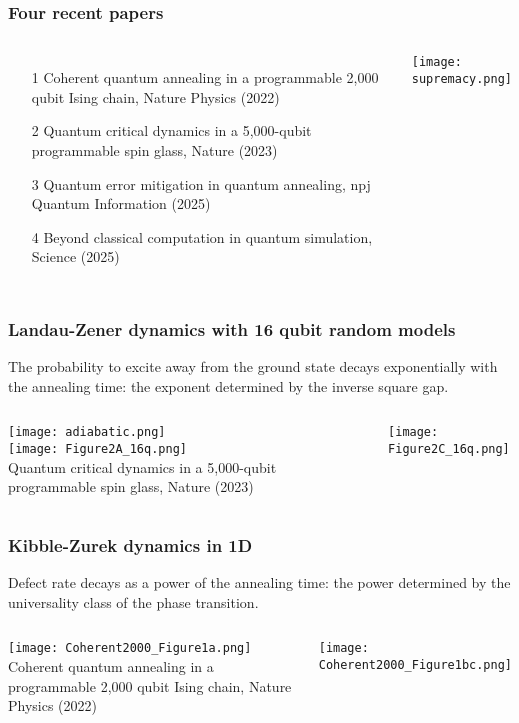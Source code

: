 \documentclass[aspectratio=169,final,11pt,forpublic]{beamer} %
\begin{document}
\begin{frame}\frametitle{\bf Four recent papers}
  \begin{columns}
    \vspace{-0.2cm}
  \begin{itemize}
    \item[1] Coherent quantum annealing in
      a programmable 2,000 qubit Ising chain, Nature
      Physics (2022)
    \item[2] Quantum critical dynamics in
      a 5,000-qubit programmable spin glass, Nature
      (2023)
    \item[3] Quantum error mitigation in quantum annealing, npj Quantum Information (2025)
    \item[4] Beyond classical computation in quantum simulation, Science (2025)
  \end{itemize}
  \texttt{[image: supremacy.png]}
\end{columns}
\end{frame}


\begin{frame}\frametitle{\bf Landau-Zener dynamics with 16 qubit random models}
  The probability to excite away from the ground state decays exponentially with the annealing time: the exponent determined by the inverse square gap. 
  \begin{columns}
    \begin{center}
    \texttt{[image: adiabatic.png]}\\
    \texttt{[image: Figure2A\_16q.png]}\\
    {\small Quantum critical dynamics in
      a 5,000-qubit programmable spin glass, Nature
      (2023)}
    \end{center}
    \texttt{[image: Figure2C\_16q.png]}
    \end{columns}
\end{frame}

\begin{frame}\frametitle{\bf Kibble-Zurek dynamics in 1D}
  Defect rate decays as a power of the annealing time: the power determined by the universality class of the phase transition.
  \begin{columns}
    \begin{center}
      \texttt{[image: Coherent2000\_Figure1a.png]}\\
      {\small Coherent quantum annealing in
      a programmable 2,000 qubit Ising chain, Nature
      Physics (2022)}
    \end{center}
    \begin{center}
      \texttt{[image: Coherent2000\_Figure1bc.png]}\\
    \end{center}
\end{columns}
\end{frame}
\end{document}
